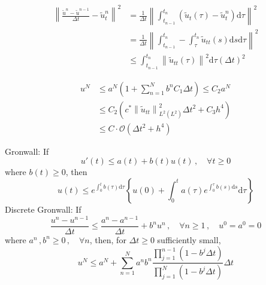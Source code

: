 \documentclass[letterpaper]{article}
\providecommand{\norm}[1]{\left\lVert#1\right\rVert}
\providecommand{\inner}[1]{\left(#1\right)}
\def\d{\mathrm{d}}
\begin{document}
\begin{multicols}{2}
\begin{align*}
\norm{\frac{\tilde u^n-\tilde u^{n-1}}{\Delta t}-\tilde u_t^n}^2&=
\frac{1}{\Delta t}\norm{\int_{t_{n-1}}^{t_n}(\tilde u_t(\tau)-\tilde
u_t^n)\d\tau}^2\\
&=\frac{1}{\Delta t}\norm{\int_{t_{n-1}}^{t_n}-\int_\tau^{t_n}\tilde u_{tt}(s)\d
s\d\tau}^2\\
&\le\int_{t_{n-1}}^{t_n}\norm{\tilde u_{tt}(\tau)}^2\d\tau(\Delta t)^2
\end{align*}

\begin{align*}
u^N&\le a^N\inner{1+\sum_{n=1}^Nb^nC_1\Delta t}\le C_2 a^N\\
&\le C_2\left(c^*\norm{\tilde u_{tt}}^2_{L^2(L^2)}\Delta t^2+C_3h^4\right)\\
&\le C\cdot\mathcal{O}(\Delta t^2+h^4)
\end{align*}

Gronwall: If
\[
u'(t)\le a(t)+b(t)u(t)\,,\quad\forall t\ge0
\]
where $b(t)\ge0$, then
\[
u(t)\le e^{\int_0^tb(\tau)\d\tau}\left\{u(0)+
\int_0^ta(\tau)e^{\int_0^\tau b(s)\d s}\d\tau\right\}
\]
Discrete Gronwall: If
\[
\frac{u^n-u^{n-1}}{\Delta t}\le\frac{a^n-a^{n-1}}{\Delta
t}+b^nu^n\,,\quad\forall n\ge 1\,,\quad u^0=a^0=0
\]
where $a^n\,,b^n\ge0\,,\quad\forall n$, then, for $\Delta t\ge0$ sufficiently
small,
\[
u^N\le a^N+\sum_{n=1}^Na^nb^n\frac{\prod_{j=1}^{n-1}(1-b^j\Delta
t)}{\prod_{j=1}^N(1-b^j\Delta t)}\Delta t
\]


\end{multicols}
\end{document}
